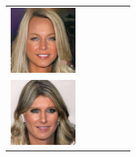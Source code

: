 \documentclass{article}
\newcommand{\pganw}{0.95in}
\begin{document}
\begin{table}[htbp]
\begin{center}
\begin{tabular}{cc|cc|cc}
\includegraphics[width=\pganw]{figures/pgan/57_base_iso_MH.jpg} \\
\includegraphics[width=\pganw]{figures/pgan/58_base_iso_base.jpg} &

\end{tabular}
\end{center}
\end{table}
\end{document}
